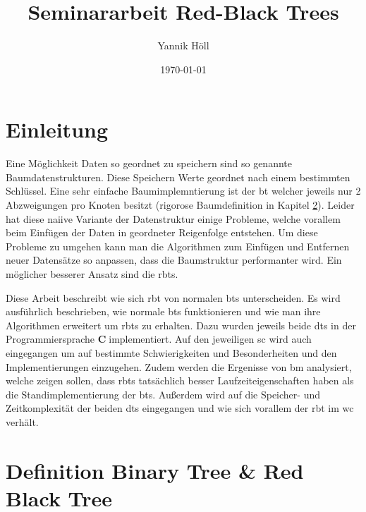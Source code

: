 \documentclass[11pt]{article}
\title{\textbf{Seminararbeit Red-Black Trees}}
\author{Yannik Höll}
\date{\today}
\newcommand{\cpl}{\textbf{C}$\;$}
\begin{document}
\begin{titlingpage}
    \maketitle
\end{titlingpage}
\pagebreak

\tableofcontents
\pagebreak

\glsaddall
\printglossary 
\pagebreak

\section{Einleitung}


Eine Möglichkeit Daten so geordnet zu speichern sind so genannte Baumdatenstrukturen. Diese Speichern Werte geordnet nach einem bestimmten Schlüssel. 
Eine sehr einfache Baumimplemntierung ist der \gls{bt} welcher jeweils nur 2 Abzweigungen pro Knoten besitzt (rigorose Baumdefinition in Kapitel \ref{def}).
Leider hat diese naiive Variante der Datenstruktur einige Probleme, welche vorallem beim Einfügen der Daten in geordneter Reigenfolge entstehen.
Um diese Probleme zu umgehen kann man die Algorithmen zum Einfügen und Entfernen neuer Datensätze so anpassen, dass die Baumstruktur performanter wird.
Ein möglicher besserer Ansatz sind die \glspl{rbt}.   

Diese Arbeit beschreibt wie sich \gls{rbt} von normalen \glspl{bt} unterscheiden. Es wird ausführlich beschrieben, wie normale \glspl{bt} funktionieren und wie man 
ihre Algorithmen erweitert um \glspl{rbt} zu erhalten.
Dazu wurden jeweils beide \glspl{dt} in der Programmiersprache \cpl implementiert. Auf den jeweiligen \gls{sc} wird auch eingegangen um auf bestimmte Schwierigkeiten und Besonderheiten und den Implementierungen einzugehen.
Zudem werden die Ergenisse von \gls{bm} analysiert, welche zeigen sollen, dass \glspl{rbt} tatsächlich besser Laufzeiteigenschaften haben als
die Standimplementierung der \glspl{bt}.
Außerdem wird auf die Speicher- und Zeitkomplexität der beiden \glspl{dt} eingegangen und wie sich vorallem der \gls{rbt} im \gls{wc} verhält. 
\pagebreak

\section{Definition Binary Tree \& Red Black Tree} \label{def}
\pagebreak
\end{document}
